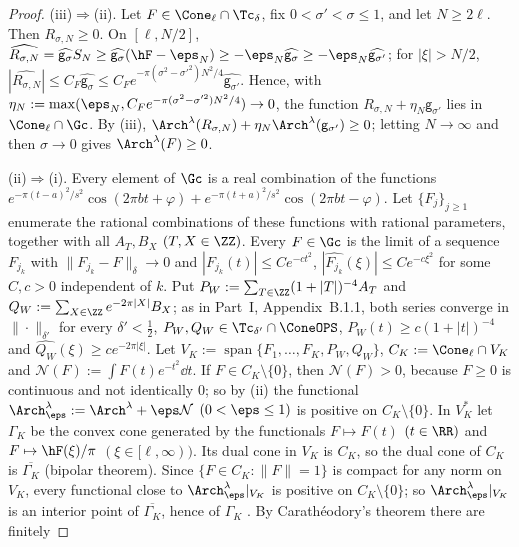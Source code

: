 \begin{proof}
(iii)$\Rightarrow$(ii). Let $F\in\Cone_\ell\cap\Tc_\delta$, fix $0<\sigma'<\sigma\le1$, and let $N\ge2\ell$. Then $R_{\sigma,N}\ge0$. On $[\ell,N/2]$,
$\widehat{R_{\sigma,N}}=\widehat{\mathsf g_\sigma}S_N\ge\widehat{\mathsf g_\sigma}(\hF-\eps_N)\ge-\eps_N\widehat{\mathsf g_\sigma}\ge-\eps_N\widehat{\mathsf g_{\sigma'}}$;
for $|\xi|>N/2$, $|\widehat{R_{\sigma,N}}|\le C_F\widehat{\mathsf g_\sigma}\le C_Fe^{-\pi(\sigma^2-\sigma'^2)N^2/4}\widehat{\mathsf g_{\sigma'}}$. Hence, with
$\eta_N:=\max(\eps_N,C_Fe^{-\pi(\sigma^2-\sigma'^2)N^2/4})\to0$, the function $R_{\sigma,N}+\eta_N\mathsf g_{\sigma'}$ lies in $\Cone_\ell\cap\Gc$. By (iii),
$\Arch^\lambda(R_{\sigma,N})+\eta_N\Arch^\lambda(\mathsf g_{\sigma'})\ge0$; letting $N\to\infty$ and then $\sigma\to0$ gives $\Arch^\lambda(F)\ge0$.

(ii)$\Rightarrow$(i). Every element of $\Gc$ is a real combination of the functions
$e^{-\pi(t-a)^2/s^2}\cos(2\pi bt+\varphi)+e^{-\pi(t+a)^2/s^2}\cos(2\pi bt-\varphi)$. Let $\{F_j\}_{j\ge1}$ enumerate the rational combinations of these
functions with rational parameters, together with all $A_T,B_X$ $(T,X\in\ZZ)$. Every $F\in\Gc$ is the limit of a sequence $F_{j_k}$ with
$\|F_{j_k}-F\|_\delta\to0$ and $|F_{j_k}(t)|\le Ce^{-ct^2}$, $|\widehat{F_{j_k}}(\xi)|\le Ce^{-c\xi^2}$ for some $C,c>0$ independent of $k$. Put
$P_W:=\sum_{T\in\ZZ}(1+|T|)^{-4}A_T$ and $Q_W:=\sum_{X\in\ZZ}e^{-2\pi|X|}B_X$; as in Part~I, Appendix~B.1.1, both series converge in
$\|\cdot\|_{\delta'}$ for every $\delta'<\frac12$, $P_W,Q_W\in\Tc_{\delta'}\cap\ConeOPS$, $P_W(t)\ge c(1+|t|)^{-4}$ and
$\widehat{Q_W}(\xi)\ge ce^{-2\pi|\xi|}$. Let $V_K:=\operatorname{span}\{F_1,\dots,F_K,P_W,Q_W\}$, $C_K:=\Cone_\ell\cap V_K$ and
$\mathcal N(F):=\int F(t)e^{-t^2}\dd t$. If $F\in C_K\setminus\{0\}$, then $\mathcal N(F)>0$, because $F\ge0$ is continuous and not identically $0$; so by
(ii) the functional $\Arch^\lambda_\eps:=\Arch^\lambda+\eps\mathcal N$ $(0<\eps\le1)$ is positive on $C_K\setminus\{0\}$. In $V_K^*$ let $\Gamma_K$ be
the convex cone generated by the functionals $F\mapsto F(t)$ $(t\in\RR)$ and $F\mapsto\hF(\xi)/\pi$ $(\xi\in[\ell,\infty))$. Its dual cone in $V_K$ is
$C_K$, so the dual cone of $C_K$ is $\overline{\Gamma_K}$ (bipolar theorem). Since $\{F\in C_K:\|F\|=1\}$ is compact for any norm on $V_K$, every
functional close to $\Arch^\lambda_\eps|_{V_K}$ is positive on $C_K\setminus\{0\}$; so $\Arch^\lambda_\eps|_{V_K}$ is an interior point of
$\overline{\Gamma_K}$, hence of $\Gamma_K$ \cite[Theorem~6.3]{Roc70}. By Carath\'eodory's theorem \cite[Theorem~17.1]{Roc70} there are finitely

\end{proof}
